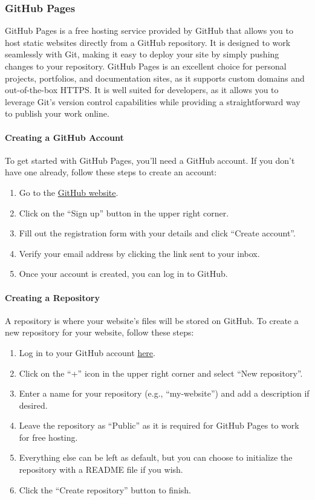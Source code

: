 \subsubsection{GitHub Pages}
GitHub Pages is a free hosting service provided by GitHub that allows you to host static websites directly from a GitHub repository. It is designed to work seamlessly with Git, making it easy to deploy your site by simply pushing changes to your repository. GitHub Pages is an excellent choice for personal projects, portfolios, and documentation sites, as it supports custom domains and out-of-the-box HTTPS. It is well suited for developers, as it allows you to leverage Git's version control capabilities while providing a straightforward way to publish your work online.

\paragraph{Creating a GitHub Account}
To get started with GitHub Pages, you'll need a GitHub account. If you don't have one already, follow these steps to create an account:
\begin{enumerate}
    \item Go to the \href{https://github.com/}{GitHub website}.
    \item Click on the ``Sign up'' button in the upper right corner.
    \item Fill out the registration form with your details and click ``Create account''.
    \item Verify your email address by clicking the link sent to your inbox.
    \item Once your account is created, you can log in to GitHub.
\end{enumerate}

\paragraph{Creating a Repository}
A repository is where your website's files will be stored on GitHub. To create a new repository for your website, follow these steps:
\begin{enumerate}
    \item Log in to your GitHub account \href{https://github.com/login}{here}.
    \item Click on the ``+'' icon in the upper right corner and select ``New repository''.
    \item Enter a name for your repository (e.g., ``my-website'') and add a description if desired.
    \item Leave the repository as ``Public'' as it is required for GitHub Pages to work for free hosting.
    \item Everything else can be left as default, but you can choose to initialize the repository with a README file if you wish.
    \item Click the ``Create repository'' button to finish.
\end{enumerate}

